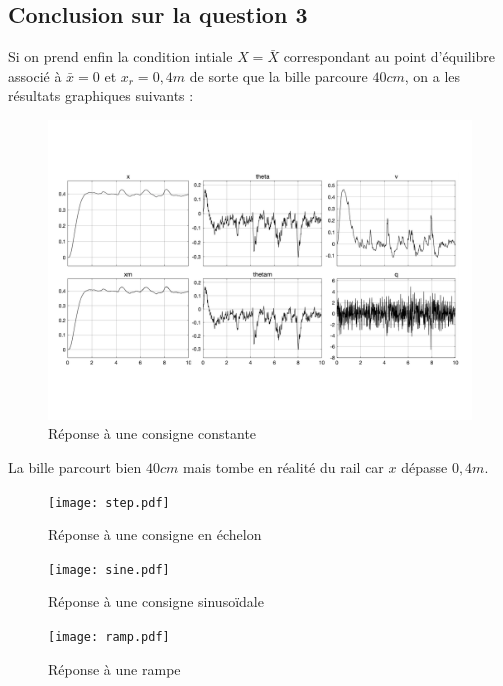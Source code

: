 \documentclass[10pt]{article}
\begin{document}
\subsection*{Conclusion sur la question 3}

\noindent Si on prend enfin la condition intiale $X = \bar X$ correspondant au point d'équilibre associé à $\bar x = 0$
et $x_r = 0,4 m$ de sorte que la bille parcoure $40 cm$, on a les résultats graphiques suivants :

\begin{figure}[H]
	\centering
	\includegraphics[width=\linewidth]{resultat.pdf}
	\caption{Réponse à une consigne constante}
\end{figure}

\noindent La bille parcourt bien $40cm$ mais tombe en réalité du rail car $x$ dépasse $0,4m$.

\vspace{10px}

\noindent {}

\begin{figure}[H]
	\centering
	\texttt{[image: step.pdf]}
	\caption{Réponse à une consigne en échelon}
\end{figure}

\begin{figure}[H]
	\centering
	\texttt{[image: sine.pdf]}
	\caption{Réponse à une consigne sinusoïdale}
\end{figure}

\begin{figure}[H]
	\centering
	\texttt{[image: ramp.pdf]}
	\caption{Réponse à une rampe}
\end{figure}
\end{document}
